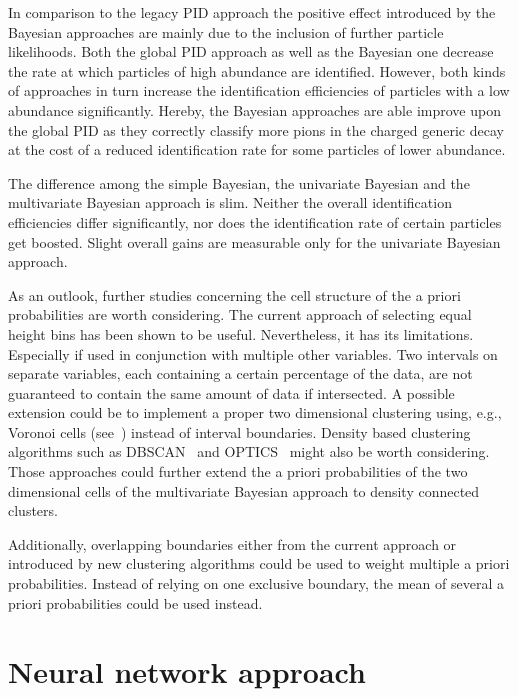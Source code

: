 In comparison to the legacy PID approach the positive effect introduced by the Bayesian approaches are mainly due to the inclusion of further particle likelihoods. Both the global PID approach as well as the Bayesian one decrease the rate at which particles of high abundance are identified. However, both kinds of approaches in turn increase the identification efficiencies of particles with a low abundance significantly. Hereby, the Bayesian approaches are able improve upon the global PID as they correctly classify more pions in the charged generic decay at the cost of a reduced identification rate for some particles of lower abundance.

The difference among the simple Bayesian, the univariate Bayesian and the multivariate Bayesian approach is slim. Neither the overall identification efficiencies differ significantly, nor does the identification rate of certain particles get boosted. Slight overall gains are measurable only for the univariate Bayesian approach.

As an outlook, further studies concerning the cell structure of the a priori probabilities are worth considering. The current approach of selecting equal height bins has been shown to be useful. Nevertheless, it has its limitations. Especially if used in conjunction with multiple other variables. Two intervals on separate variables, each containing a certain percentage of the data, are not guaranteed to contain the same amount of data if intersected. A possible extension could be to implement a proper two dimensional clustering using, e.g., Voronoi cells (see~\cite{KnowledgeDiscoveryInDatabases1:Clustering}) instead of interval boundaries. Density based clustering algorithms such as DBSCAN~\cite{KnowledgeDiscoveryInDatabases1:Clustering} and OPTICS~\cite{KnowledgeDiscoveryInDatabases1:Clustering} might also be worth considering. Those approaches could further extend the a priori probabilities of the two dimensional cells of the multivariate Bayesian approach to density connected clusters.

Additionally, overlapping boundaries either from the current approach or introduced by new clustering algorithms could be used to weight multiple a priori probabilities. Instead of relying on one exclusive boundary, the mean of several a priori probabilities could be used instead.

\section{Neural network approach}
\label{sec:neural_network_approach}

